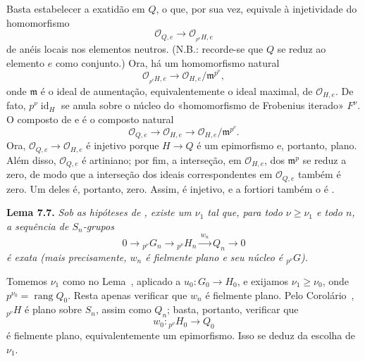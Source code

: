 Basta estabelecer a exatidão em \(Q\), o que, por sua vez, equivale à
injetividade do homomorfismo
\begin{equation}
  \tag{x}
  \mathscr O_{Q,e}\longrightarrow
  \mathscr O_{{}_{p^\nu}H,e}
\end{equation}
de anéis locais nos elementos neutros. (N.B.: recorde-se que \(Q\)
se reduz ao elemento \(e\) como conjunto.) Ora, há um homomorfismo natural
\begin{equation}
  \tag{xx}
  \mathscr O_{{}_{p^\nu}H,e}
  \longrightarrow
  \mathscr O_{H,e}/\mathfrak m^{p^\nu},
\end{equation}
onde \(\mathfrak m\) é o ideal de aumentação, equivalentemente o ideal
maximal, de \(\mathscr O_{H,e}\). De fato,
\(p^\nu\operatorname{id}_H\) se anula sobre o núcleo do «homomorfismo de
Frobenius iterado» \(F^\nu\). O composto de
 e
 é o composto natural
\begin{equation}
  \tag{xxx}
  \mathscr O_{Q,e}\longrightarrow
  \mathscr O_{H,e}\longrightarrow
  \mathscr O_{H,e}/\mathfrak m^{p^\nu}.
\end{equation}
Ora, \(\mathscr O_{Q,e}\to\mathscr O_{H,e}\) é injetivo porque
\(H\to Q\) é um epimorfismo e, portanto, plano. Além disso,
\(\mathscr O_{Q,e}\) é artiniano; por fim, a interseção, em
\(\mathscr O_{H,e}\), dos \(\mathfrak m^p\) se reduz a zero, de modo que
a interseção dos ideais correspondentes em \(\mathscr O_{Q,e}\)
também é zero. Um deles é, portanto, zero. Assim,
 é injetivo, e a fortiori também
o é .

\medskip
\noindent{}\textbf{Lema 7.7.}
\textit{Sob as hipóteses de
, existe um \(\nu_1\) tal
que, para todo \(\nu\geq\nu_1\) e todo \(n\), a sequência de
\(S_n\)-grupos}
\[
  0\longrightarrow{}_{p^\nu}G_n
  \longrightarrow{}_{p^\nu}H_n
  \xrightarrow{\,w_n\,}Q_n
  \longrightarrow0
\]
\textit{é exata (mais precisamente, \(w_n\) é fielmente plano e seu
núcleo é \({}_{p^\nu}G\)).}

Tomemos \(\nu_1\) como no Lema~,
aplicado a \(u_0:G_0\to H_0\), e exijamos \(\nu_1\geq\nu_0\), onde
\(p^{\nu_0}=\operatorname{rang}Q_0\). Resta apenas verificar que \(w_n\) é
fielmente plano. Pelo Corolário~,
\({}_{p^\nu}H\) é plano sobre \(S_n\), assim como \(Q_n\); basta, portanto,
verificar que
\[
  w_0:{}_{p^\nu}H_0\longrightarrow Q_0
\]
é fielmente plano, equivalentemente um epimorfismo. Isso se deduz da
escolha de \(\nu_1\).

